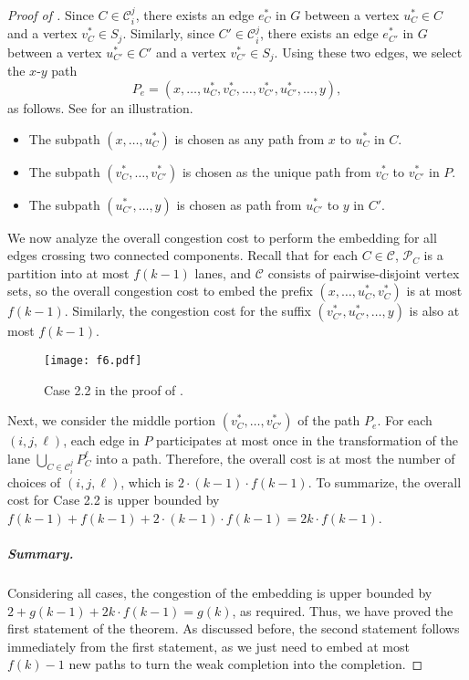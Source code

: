 \documentclass[11pt]{article}
\theoremstyle{definition}
\theoremstyle{remark}
\begin{document}
\begin{proof}[Proof of ]
Since $C \in \mathcal{C}_i^j$, there exists an edge $e_C^\ast$ in $G$ between a vertex $u_C^\ast \in C$ and a vertex $v_C^\ast \in S_j$. Similarly, since $C' \in \mathcal{C}_i^j$, there exists an edge $e_{C'}^\ast$ in $G$ between a vertex $u_{C'}^\ast \in C'$ and a vertex $v_{C'}^\ast \in S_j$. Using these two edges, we select the $x$-$y$ path \[P_{e}=(x, \ldots, u_C^\ast, v_C^\ast, \ldots, v_{C'}^\ast, u_{C'}^\ast, \ldots, y),\] as follows. See  for an illustration.
\begin{itemize}
    \item The subpath $(x, \ldots, u_C^\ast)$ is chosen as any path from $x$ to $u_C^\ast$ in $C$.
    \item The subpath $(v_C^\ast, \ldots, v_{C'}^\ast)$ is chosen as the unique path from $v_C^\ast$ to $v_{C'}^\ast$ in $P$.
    \item The subpath $(u_{C'}^\ast, \ldots, y)$ is chosen as path from $u_{C'}^\ast$ to $y$ in $C'$.
\end{itemize}
We now analyze the overall congestion cost to perform the embedding for all edges crossing two connected components. Recall that for each $C \in \mathcal{C}$, $\mathcal{P}_C$ is a partition into at most $f(k-1)$ lanes, and $\mathcal{C}$ consists of pairwise-disjoint vertex sets, so the overall congestion cost to embed the prefix $(x, \ldots, u_C^\ast, v_C^\ast)$ is at most $f(k-1)$. Similarly, the congestion cost for the suffix $(v_{C'}^\ast, u_{C'}^\ast, \ldots, y)$ is also at most $f(k-1)$. 


\begin{figure}[ht!]
    \centering
    \texttt{[image: f6.pdf]}
    \caption{Case 2.2 in the proof of  .}
    \label{fig:f6}
\end{figure}

Next, we consider the middle portion $(v_C^\ast, \ldots, v_{C'}^\ast)$ of the path $P_{e}$. For each $(i,j,\ell)$, each edge in $P$ participates at most once in the
transformation of the lane $\bigcup_{C \in \mathcal{C}_i^j} {P}_C^\ell$ into a path. Therefore, the overall cost is at most the number of choices of $(i,j,\ell)$, which is $2 \cdot (k-1) \cdot f(k-1)$.
To summarize, the overall cost for Case 2.2 is upper bounded by  $f(k-1) + f(k-1) + 2 \cdot (k-1) \cdot f(k-1) = 2k\cdot f(k-1)$.

\subparagraph{Summary.} Considering all cases, the congestion of the embedding is upper bounded by $2 + g(k-1) + 2k\cdot f(k-1) = g(k)$, as required. Thus, we have proved the first statement of the theorem. As discussed before, the second statement follows immediately from the first statement, as we just need to embed at most $f(k)-1$ new paths to turn the weak completion into the completion.
\end{proof}
\end{document}
